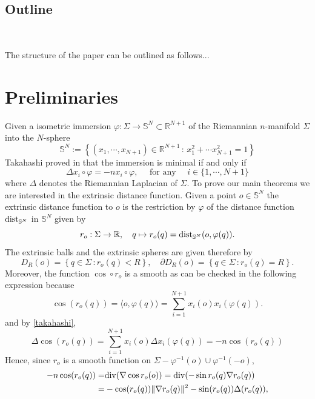 \documentclass{amsart}
\theoremstyle{definition}
\theoremstyle{remark}
\begin{document}
\subsection{Outline}\

The structure of the paper can be outlined as follows...



\section{Preliminaries}
Given a isometric immersion $\varphi:\Sigma \to \mathbb{S}^N\subset \mathbb{R}^{N+1} $ of the Riemannian $n$-manifold $\Sigma$ into the $N$-sphere
$$
\mathbb{S}^N:=\left\lbrace (x_1,\cdots, x_{N+1})\in \mathbb{R}^{N+1}\, :\, x_1^2+\cdots x_{N+1}^2=1\right\rbrace
$$
Takahashi proved in \cite{Takahashi1966380} that the immersion is minimal if and only if 
\begin{equation}\label{takahashi}
\Delta x_i\circ \varphi=-n x_i\circ \varphi, \quad \text{ for any }\quad i\in \{1,\cdots, N+1\}    
\end{equation}
where $\Delta$ denotes the Riemannian Laplacian of $\Sigma$. To prove our main theorems we are interested in the extrinsic distance function. Given a point $o\in \mathbb{S}^N$ the extrinsic distance function to $o$ is the restriction by $\varphi$ of the distance function ${\rm dist}_{\mathbb{S}^N}$ in $\mathbb{S}^N$ given by
$$
r_o:\Sigma\to \mathbb{R},\quad q\mapsto r_o(q)={\rm dist}_{\mathbb{S}^N}(o,\varphi(q)).
$$
The extrinsic balls and the extrinsic spheres are given therefore by
$$
D_R(o)=\left\lbrace q\in \Sigma\, : r_o(q)<R\right\rbrace, \quad \partial D_R(o)=\left\lbrace q\in \Sigma\, : r_o(q)=R\right\rbrace.
$$
Moreover, the function $\cos\circ r_o$ is a smooth as can be checked in the following expression because
$$
\cos(r_o(q))=\langle o,\varphi(q)\rangle =\sum_{i=1}^{N+1}x_i(o)x_i(\varphi(q)).
$$
and by \eqref{takahashi},
\begin{equation}\label{lapcos}
\Delta\cos(r_o(q))=\sum_{i=1}^{N+1}x_i(o)\Delta x_i(\varphi(q))=-n\cos(r_o(q))    
\end{equation}
Hence, since $r_o$ is a smooth function on $\Sigma-\varphi^{-1}(o)\cup \varphi^{-1}(-o)$,
\begin{equation}\begin{aligned}
-n\cos(r_o(q))=&  {\rm div}(\nabla \cos r_o(o))={\rm div}(-\sin r_o(q)\nabla r_o(q) )\\
=&-\cos(r_o(q))\Vert \nabla r_o(q)\Vert^2-\sin(r_o(q))\Delta (r_o(q)),
\end{aligned}
\end{equation}
\end{document}
